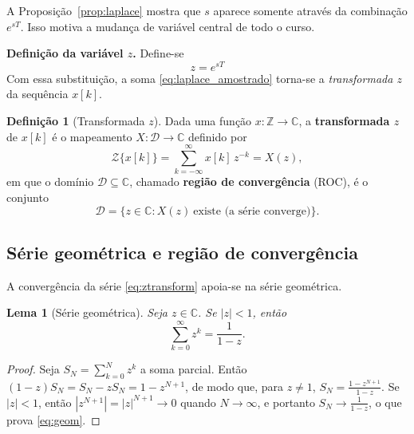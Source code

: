 \documentclass[11pt,a4paper,oneside]{book}
\theoremstyle{definition}
\newtheorem{definicao}{Definição}[chapter]
\theoremstyle{plain}
\newtheorem{lema}{Lema}[chapter]
\newcommand{\Ztr}{\mathcal{Z}}
\begin{document}
A Proposição~\ref{prop:laplace} mostra que $s$ aparece somente através da
combinação $e^{sT}$. Isso motiva a mudança de variável central de todo o curso.

\begin{destaque}
\textbf{Definição da variável $z$.} Define-se
\begin{equation}
    \boxed{\,z=e^{sT}\,}
    \label{eq:zdef}
\end{equation}
Com essa substituição, a soma \eqref{eq:laplace_amostrado} torna-se a
\emph{transformada $z$} da sequência $x[k]$.
\end{destaque}

\begin{definicao}[Transformada $z$]
\label{def:z}
Dada uma função $x:\mathbb{Z}\to\mathbb{C}$, a \textbf{transformada $z$} de
$x[k]$ é o mapeamento $X:\mathcal{D}\to\mathbb{C}$ definido por
\begin{equation}
    \Ztr\{x[k]\}=\sum_{k=-\infty}^{\infty}x[k]\,z^{-k}=X(z),
    \label{eq:ztransform}
\end{equation}
em que o domínio $\mathcal{D}\subseteq\mathbb{C}$, chamado \textbf{região de
convergência} (ROC), é o conjunto
\begin{equation}
    \mathcal{D}=\{z\in\mathbb{C}:X(z)\ \text{existe (a série converge)}\}.
    \label{eq:roc}
\end{equation}
\end{definicao}

\subsection{Série geométrica e região de convergência}

A convergência da série \eqref{eq:ztransform} apoia-se na série geométrica.

\begin{lema}[Série geométrica]
\label{lema:geom}
Seja $z\in\mathbb{C}$. Se $|z|<1$, então
\begin{equation}
    \sum_{k=0}^{\infty}z^{k}=\frac{1}{1-z}.
    \label{eq:geom}
\end{equation}
\end{lema}

\begin{proof}
Seja $S_N=\sum_{k=0}^{N}z^k$ a soma parcial. Então
$(1-z)S_N=S_N-zS_N=1-z^{N+1}$, de modo que, para $z\neq 1$,
$S_N=\frac{1-z^{N+1}}{1-z}$. Se $|z|<1$, então $|z^{N+1}|=|z|^{N+1}\to 0$ quando
$N\to\infty$, e portanto $S_N\to\frac{1}{1-z}$, o que prova \eqref{eq:geom}.
\end{proof}
\end{document}
